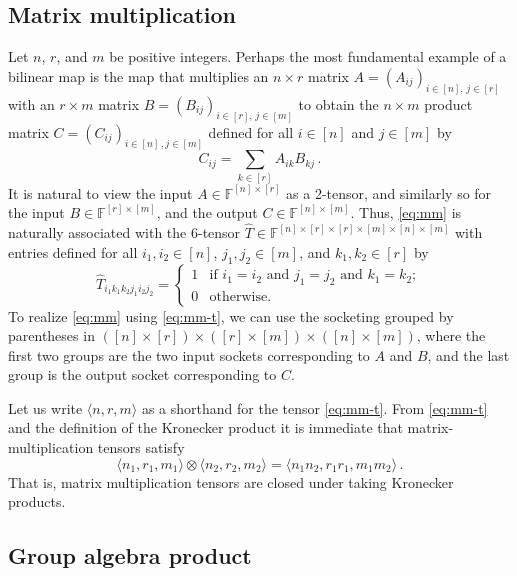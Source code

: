 \documentclass{toc}
\newcommand{\bra}{\ensuremath{\langle}}
\newcommand{\ket}{\ensuremath{\rangle}}
\newcommand{\F}{\ensuremath{\mathbb{F}}}
\begin{document}
\subsection{Matrix multiplication}
\label{sect:mm}

Let $n$, $r$, and $m$ be positive integers.
Perhaps the most fundamental example of a bilinear map is the map
that multiplies
an $n\times r$ matrix $A=(A_{ij})_{i\in[n],\,j\in [r]}$ with
an $r\times m$ matrix $B=(B_{ij})_{i\in[r],\,j\in [m]}$
to obtain the $n\times m$ product matrix $C=(C_{ij})_{i\in [n]\,,j\in [m]}$
defined for all $i\in[n]$ and $j\in [m]$ by
\begin{equation}
\label{eq:mm}
C_{ij}=\sum_{k\in[r]} A_{ik}B_{kj}\,.
\end{equation}
It is natural to view the input $A\in\F^{[n]\times [r]}$ as a 2-tensor,
and similarly so for the input $B\in\F^{[r]\times [m]}$, and the
output $C\in\F^{[n]\times [m]}$. Thus, \eqref{eq:mm} is naturally
associated with the 6-tensor
$\hat{T} \in\F^{[n]\times [r]\times [r]\times [m]\times [n]\times [m]}$ with
entries defined for all $i_1,i_2\in [n]$, $j_1, j_2\in[m]$, and
$k_1,k_2\in[r]$ by
\begin{equation}
\label{eq:mm-t}
\hat{T}_{i_1\!k_1\!k_2j_1\!i_2j_2}=
\begin{cases}
1 & \text{if $i_1=i_2$ and $j_1=j_2$ and $k_1=k_2$};\\
0 & \text{otherwise}.
\end{cases}
\end{equation}
To realize \eqref{eq:mm} using \eqref{eq:mm-t}, we can use the socketing
grouped by parentheses in
$([n]\times [r])\times([r]\times [m])\times([n]\times [m])$, where the first
two groups are the two input sockets corresponding to $A$ and $B$,
and the last group is the output socket corresponding to $C$.

Let us write $\bra n,r,m\ket$ as a shorthand for the tensor \eqref{eq:mm-t}.
From \eqref{eq:mm-t} and the definition of the Kronecker product
it is immediate that matrix-multiplication tensors satisfy
\begin{equation}
\label{eq:mm-kron}
\bra n_1,r_1,m_1\ket
\otimes
\bra n_2,r_2,m_2\ket
=
\bra n_1n_2,r_1r_1,m_1m_2\ket\,.
\end{equation}
That is, matrix multiplication tensors are closed under taking  Kronecker products.


\subsection{Group algebra product}
\end{document}
